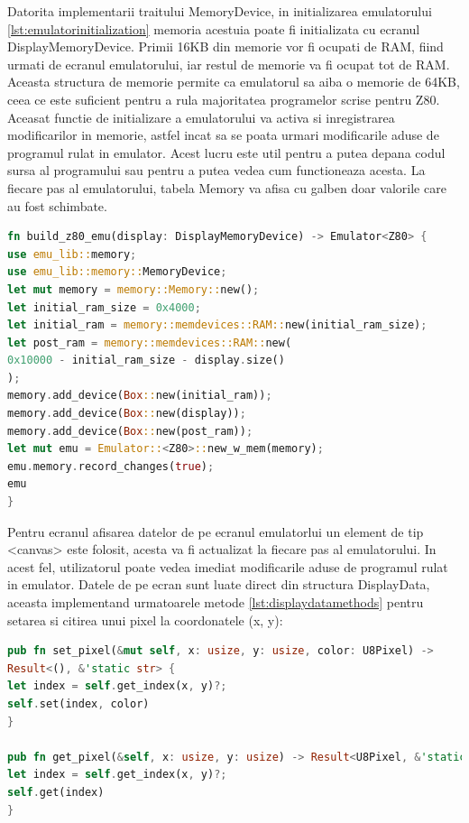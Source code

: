 \documentclass[titlepage,12pt]{article}
\DeclareRobustCommand{\code}[1]{{\ttfamily\small #1}}
\begin{document}
Datorita implementarii traitului \code{MemoryDevice}, in initializarea emulatorului \cref{lst:emulatorinitialization} memoria acestuia poate fi initializata cu ecranul \code{DisplayMemoryDevice}.
Primii 16KB din memorie vor fi ocupati de \code{RAM}, fiind urmati de ecranul emulatorului, iar restul de memorie va fi ocupat tot de \code{RAM}. Aceasta structura de memorie permite ca emulatorul sa aiba o memorie de 64KB, ceea ce este suficient pentru a rula majoritatea programelor scrise pentru \ac {Z80}. Aceasat functie de initializare a emulatorului va activa si inregistrarea modificarilor in memorie, astfel incat sa se poata urmari modificarile aduse de programul rulat in emulator. Acest lucru este util pentru a putea depana codul sursa al programului sau pentru a putea vedea cum functioneaza acesta. La fiecare pas al emulatorului, tabela \code{Memory} va afisa cu galben doar valorile care au fost schimbate.
\begin{lstlisting}[language=Rust,caption={Initializarea emulatorului},label={lst:emulatorinitialization}]
fn build_z80_emu(display: DisplayMemoryDevice) -> Emulator<Z80> {
use emu_lib::memory;
use emu_lib::memory::MemoryDevice;
let mut memory = memory::Memory::new();
let initial_ram_size = 0x4000;
let initial_ram = memory::memdevices::RAM::new(initial_ram_size);
let post_ram = memory::memdevices::RAM::new(
0x10000 - initial_ram_size - display.size()
);
memory.add_device(Box::new(initial_ram));
memory.add_device(Box::new(display));
memory.add_device(Box::new(post_ram));
let mut emu = Emulator::<Z80>::new_w_mem(memory);
emu.memory.record_changes(true);
emu
}
\end{lstlisting}

Pentru ecranul afisarea datelor de pe ecranul emulatorlui un element de tip \code{<canvas>} este folosit, acesta va fi actualizat la fiecare pas al emulatorului. In acest fel, utilizatorul poate vedea imediat modificarile aduse de programul rulat in emulator. Datele de pe ecran sunt luate direct din structura \code {DisplayData}, aceasta implementand urmatoarele metode \cref {lst:displaydatamethods} pentru setarea si citirea unui pixel la coordonatele \code{(x, y)}:
\begin{lstlisting}[language=Rust,caption={Metodele de setare si citire a pixelilor},label={lst:displaydatamethods}]
pub fn set_pixel(&mut self, x: usize, y: usize, color: U8Pixel) ->
Result<(), &'static str> {
let index = self.get_index(x, y)?;
self.set(index, color)
}

pub fn get_pixel(&self, x: usize, y: usize) -> Result<U8Pixel, &'static str> {
let index = self.get_index(x, y)?;
self.get(index)
}
\end{lstlisting}
\end{document}
